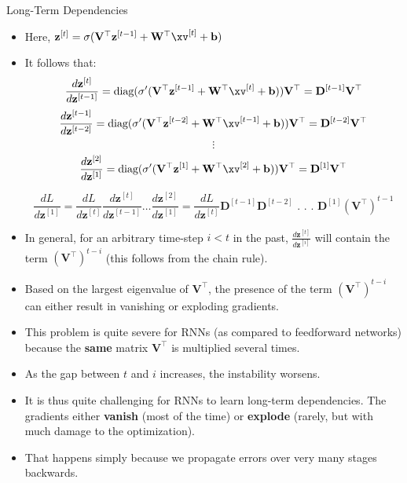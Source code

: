 \begin{vbframe}{Long-Term Dependencies}
  
  \begin{itemize}
    \item Here, $\mathbf{z}^{[t]} = \sigma(\mathbf{V}^\top \mathbf{z}^{[t-1]} + \mathbf{W}^\top \xv^{[t]} + \mathbf{b})$
    \item It follows that:
    $$ \frac{d \mathbf{z}^{[t]}}{d\mathbf{z}^{[t-1]}} = \text{diag}(\sigma' (\mathbf{V}^\top \mathbf{z}^{[t-1]} + \mathbf{W}^\top \xv^{[t]} + \mathbf{b})) \mathbf{V}^\top = \mathbf{D}^{[t-1]} \mathbf{V}^\top $$
    $$ \frac{d \mathbf{z}^{[t-1]}}{d\mathbf{z}^{[t-2]}} = \text{diag}(\sigma' (\mathbf{V}^\top \mathbf{z}^{[t-2]} + \mathbf{W}^\top \xv^{[t-1]} + \mathbf{b})) \mathbf{V}^\top= \mathbf{D}^{[t-2]} \mathbf{V}^\top $$
    $$ \vdots $$
    $$ \frac{d \mathbf{z}^{[2]}}{d\mathbf{z}^{[1]}} = \text{diag}(\sigma' (\mathbf{V}^\top \mathbf{z}^{[1]} + \mathbf{W}^\top \xv^{[2]} + \mathbf{b})) \mathbf{V}^\top = \mathbf{D}^{[1]} \mathbf{V}^\top $$
    
    $$ \frac{d L}{d \mathbf{z}^{[1]}} = \frac{d L}{d \mathbf{z}^{[t]}} \frac{d \mathbf{z}^{[t]}}{d \mathbf{z}^{[t-1]}} \dots \frac{d \mathbf{z}^{[2]}}{d \mathbf{z}^{[1]}} = \frac{d L}{d \mathbf{z}^{[t]}} \mathbf{D}^{[t-1]} \mathbf{D}^{[t-2]}   \text{ . . . } \mathbf{D}^{[1]} (\mathbf{V}^\top)^{t-1}$$
    \item In general, for an arbitrary time-step $i<t$ in the past, $\frac{d\mathbf{z}^{[t]}}{d\mathbf{z}^{[i]}}$ will contain the term $(\mathbf{V}^\top)^{t-i}$ (this follows from the chain rule).
    \item Based on the largest eigenvalue of $\mathbf{V}^\top$, the presence of the term $(\mathbf{V}^\top)^{t-i}$ can either result in vanishing or exploding gradients.
    \item This problem is quite severe for RNNs (as compared to feedforward networks) because the \textbf{same} matrix $\mathbf{V}^\top$ is multiplied several times. \href{https://tinyurl.com/vangrad}{}
    \item As the gap between $t$ and $i$ increases, the instability worsens.
    \item It is thus quite challenging for RNNs to learn long-term dependencies. The gradients either \textbf{vanish} (most of the time) or \textbf{explode} (rarely, but with much damage to the optimization).
    \item That happens simply because we propagate errors over very many stages backwards.
  \end{itemize}
  

\end{vbframe}
